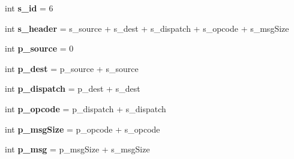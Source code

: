 \begin{DoxyCompactItemize}
\item 
\hypertarget{interfacecom_1_1mobii_1_1protocol_1_1_i_protocol_com_a7fabeb5c0e54f5ceaa2d9130ab7d4e97}{int {\bfseries s\-\_\-id} = 6}\label{interfacecom_1_1mobii_1_1protocol_1_1_i_protocol_com_a7fabeb5c0e54f5ceaa2d9130ab7d4e97}

\item 
\hypertarget{interfacecom_1_1mobii_1_1protocol_1_1_i_protocol_com_a7822bed811216e432186f9beed34a6c6}{int {\bfseries s\-\_\-header} = s\-\_\-source + s\-\_\-dest + s\-\_\-dispatch + s\-\_\-opcode + s\-\_\-msg\-Size}\label{interfacecom_1_1mobii_1_1protocol_1_1_i_protocol_com_a7822bed811216e432186f9beed34a6c6}

\item 
\hypertarget{interfacecom_1_1mobii_1_1protocol_1_1_i_protocol_com_a2755cee9153acb5f75c7c8e49409a2e8}{int {\bfseries p\-\_\-source} = 0}\label{interfacecom_1_1mobii_1_1protocol_1_1_i_protocol_com_a2755cee9153acb5f75c7c8e49409a2e8}

\item 
\hypertarget{interfacecom_1_1mobii_1_1protocol_1_1_i_protocol_com_a4e58802e290cdf1e6641a93f25d98784}{int {\bfseries p\-\_\-dest} = p\-\_\-source + s\-\_\-source}\label{interfacecom_1_1mobii_1_1protocol_1_1_i_protocol_com_a4e58802e290cdf1e6641a93f25d98784}

\item 
\hypertarget{interfacecom_1_1mobii_1_1protocol_1_1_i_protocol_com_a3c1f4aa710f1c991b5871b57b6053197}{int {\bfseries p\-\_\-dispatch} = p\-\_\-dest + s\-\_\-dest}\label{interfacecom_1_1mobii_1_1protocol_1_1_i_protocol_com_a3c1f4aa710f1c991b5871b57b6053197}

\item 
\hypertarget{interfacecom_1_1mobii_1_1protocol_1_1_i_protocol_com_a86f9b18a18d1b46d4304d4db36674b7f}{int {\bfseries p\-\_\-opcode} = p\-\_\-dispatch + s\-\_\-dispatch}\label{interfacecom_1_1mobii_1_1protocol_1_1_i_protocol_com_a86f9b18a18d1b46d4304d4db36674b7f}

\item 
\hypertarget{interfacecom_1_1mobii_1_1protocol_1_1_i_protocol_com_ae0bb45a2490859c45cd01fb6458116a6}{int {\bfseries p\-\_\-msg\-Size} = p\-\_\-opcode + s\-\_\-opcode}\label{interfacecom_1_1mobii_1_1protocol_1_1_i_protocol_com_ae0bb45a2490859c45cd01fb6458116a6}

\item 
\hypertarget{interfacecom_1_1mobii_1_1protocol_1_1_i_protocol_com_ae9b1d8977d38232a6ff736d4999034cb}{int {\bfseries p\-\_\-msg} = p\-\_\-msg\-Size + s\-\_\-msg\-Size}\label{interfacecom_1_1mobii_1_1protocol_1_1_i_protocol_com_ae9b1d8977d38232a6ff736d4999034cb}


\end{DoxyCompactItemize}
